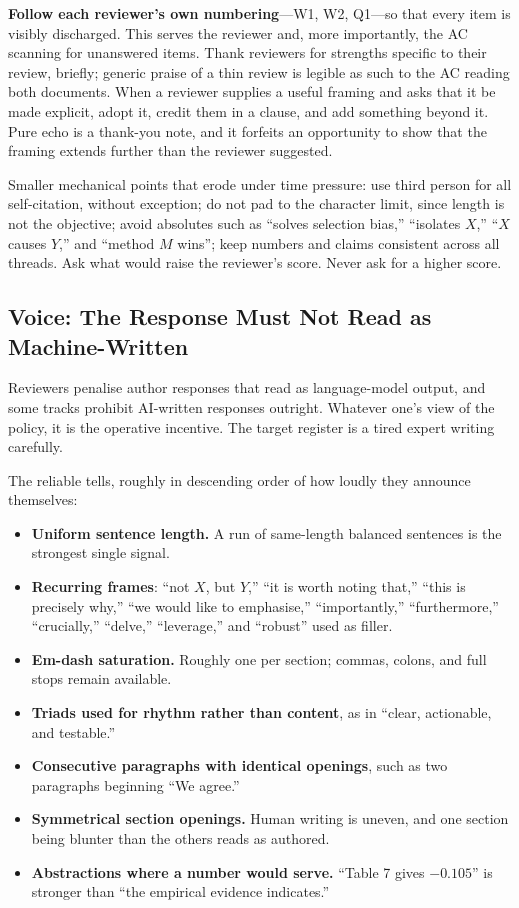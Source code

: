 \textbf{Follow each reviewer's own numbering}---W1, W2, Q1---so that every item is visibly discharged.
This serves the reviewer and, more importantly, the AC scanning for unanswered items.
Thank reviewers for strengths specific to their review, briefly; generic praise of a thin review is legible as such to the AC reading both documents.
When a reviewer supplies a useful framing and asks that it be made explicit, adopt it, credit them in a clause, and add something beyond it.
Pure echo is a thank-you note, and it forfeits an opportunity to show that the framing extends further than the reviewer suggested.

Smaller mechanical points that erode under time pressure: use third person for all self-citation, without exception; do not pad to the character limit, since length is not the objective; avoid absolutes such as ``solves selection bias,'' ``isolates $X$,'' ``$X$ causes $Y$,'' and ``method $M$ wins''; keep numbers and claims consistent across all threads.
Ask what would raise the reviewer's score.
Never ask for a higher score.

\subsection*{Voice: The Response Must Not Read as Machine-Written}

Reviewers penalise author responses that read as language-model output, and some tracks prohibit AI-written responses outright.
Whatever one's view of the policy, it is the operative incentive.
The target register is a tired expert writing carefully.

The reliable tells, roughly in descending order of how loudly they announce themselves:
\begin{itemize}
    \item \textbf{Uniform sentence length.}
    A run of same-length balanced sentences is the strongest single signal.
    \item \textbf{Recurring frames}: ``not $X$, but $Y$,'' ``it is worth noting that,'' ``this is precisely why,'' ``we would like to emphasise,'' ``importantly,'' ``furthermore,'' ``crucially,'' ``delve,'' ``leverage,'' and ``robust'' used as filler.
    \item \textbf{Em-dash saturation.}
    Roughly one per section; commas, colons, and full stops remain available.
    \item \textbf{Triads used for rhythm rather than content}, as in ``clear, actionable, and testable.''
    \item \textbf{Consecutive paragraphs with identical openings}, such as two paragraphs beginning ``We agree.''
    \item \textbf{Symmetrical section openings.}
    Human writing is uneven, and one section being blunter than the others reads as authored.
    \item \textbf{Abstractions where a number would serve.}
    ``Table 7 gives $-0.105$'' is stronger than ``the empirical evidence indicates.''
\end{itemize}

